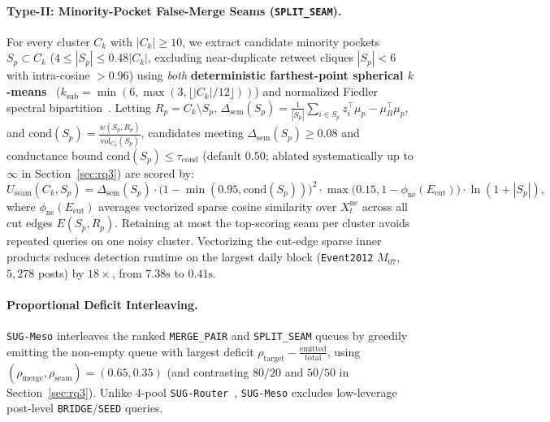 \paragraph{Type-II: Minority-Pocket False-Merge Seams (\texttt{SPLIT\_SEAM}).}
For every cluster $C_k$ with $|C_k| \ge 10$, we extract candidate minority pockets $S_p \subset C_k$ ($4 \le |S_p| \le 0.48|C_k|$, excluding near-duplicate retweet cliques $|S_p| < 6$ with intra-cosine $> 0.96$) using \emph{both} \textbf{deterministic farthest-point spherical $k$-means}~\citep{gonzalez1985clustering,banerjee2005clustering} ($k_{\text{sub}} = \min(6, \max(3, \lfloor |C_k|/12 \rfloor))$) and normalized Fiedler spectral bipartition~\citep{fiedler1973algebraic}. Letting $R_p = C_k \setminus S_p$, $\Delta_{\text{sem}}(S_p) = \frac{1}{|S_p|}\sum_{i\in S_p} z_i^\top \mu_p - \mu_R^\top \mu_p$, and $\text{cond}(S_p) = \frac{w(S_p, R_p)}{\text{vol}_{C_k}(S_p)}$, candidates meeting $\Delta_{\text{sem}}(S_p) \ge 0.08$ and conductance bound $\text{cond}(S_p) \le \tau_{\text{cond}}$ (default $0.50$; ablated systematically up to $\infty$ in Section~\ref{sec:rq3}) are scored by:
\begin{equation}
\label{eq:u_seam}
U_{\text{seam}}(C_k, S_p) = \Delta_{\text{sem}}(S_p)\cdot \big(1 - \min(0.95, \text{cond}(S_p))\big)^2 \cdot \max\big(0.15, 1 - \phi_{\text{ne}}(E_{\text{cut}})\big)\cdot \ln(1 + |S_p|),
\end{equation}
where $\phi_{\text{ne}}(E_{\text{cut}})$ averages vectorized sparse cosine similarity over $X_t^{\text{ne}}$ across all cut edges $E(S_p, R_p)$. Retaining at most the top-scoring seam per cluster avoids repeated queries on one noisy cluster. Vectorizing the cut-edge sparse inner products reduces detection runtime on the largest daily block (\texttt{Event2012} $M_{07}$, $5{,}278$ posts) by $18\times$, from $7.38\text{s}$ to $0.41\text{s}$.

\paragraph{Proportional Deficit Interleaving.}
\texttt{SUG-Meso} interleaves the ranked \texttt{MERGE\_PAIR} and \texttt{SPLIT\_SEAM} queues by greedily emitting the non-empty queue with largest deficit $\rho_{\text{target}} - \frac{\text{emitted}}{\text{total}}$, using $(\rho_{\text{merge}}, \rho_{\text{seam}}) = (0.65, 0.35)$ (and contrasting $80/20$ and $50/50$ in Section~\ref{sec:rq3}). Unlike $4$-pool \texttt{SUG-Router}~\citep{cao2024hisevent}, \texttt{SUG-Meso} excludes low-leverage post-level \texttt{BRIDGE}/\texttt{SEED} queries.

